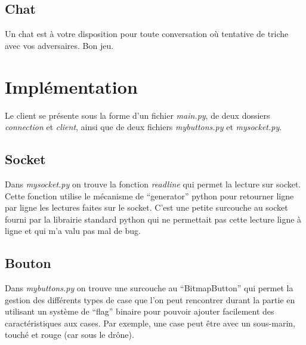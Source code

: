 \documentclass[a4paper, 11pt]{report}
\begin{document}
\subsection{Chat}
Un chat est à votre disposition pour toute conversation où tentative de triche avec vos adversaires.
\newline
\newline
Bon jeu.

\section{Implémentation}

Le client se présente sous la forme d'un fichier \emph{main.py}, de deux dossiers 
\emph{connection} et \emph{client}, ainsi que de deux fichiers
\emph{mybuttons.py} et \emph{mysocket.py}.

\subsection{Socket}
Dans \emph{mysocket.py} on trouve la fonction \emph{readline} 
qui permet la lecture sur socket. Cette fonction utilise le mécanisme de ``generator'' python pour retourner ligne par ligne 
les lectures faites sur le socket. C'est une petite surcouche au socket fourni par la librairie standard python qui ne permettait pas cette 
lecture ligne à ligne et qui m'a valu pas mal de bug.

\subsection{Bouton}
Dans \emph{mybuttons.py} on trouve une surcouche au ``BitmapButton'' qui permet la gestion des différents types de 
case que l'on peut rencontrer durant la partie en utilisant un système de ``flag'' binaire pour pouvoir ajouter facilement des caractéristiques aux cases.
Par exemple, une case peut être avec un sous-marin, touché et rouge (car sous le drône).
\end{document}
